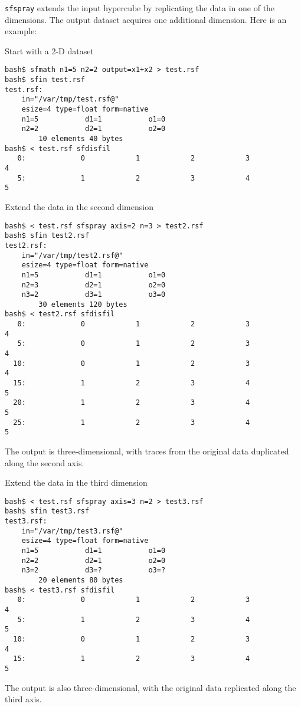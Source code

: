 \noindent\doublebox{\parbox{\textwidth}{
    
  }}

\texttt{sfspray} extends the input hypercube by replicating the data
in one of the dimensions. The output dataset acquires one additional
dimension. Here is an example:

Start with a 2-D dataset
\begin{verbatim}
bash$ sfmath n1=5 n2=2 output=x1+x2 > test.rsf
bash$ sfin test.rsf
test.rsf:
    in="/var/tmp/test.rsf@"
    esize=4 type=float form=native 
    n1=5           d1=1           o1=0          
    n2=2           d2=1           o2=0          
        10 elements 40 bytes
bash$ < test.rsf sfdisfil
   0:             0            1            2            3            4
   5:             1            2            3            4            5
\end{verbatim}

Extend the data in the second dimension
\begin{verbatim}
bash$ < test.rsf sfspray axis=2 n=3 > test2.rsf
bash$ sfin test2.rsf
test2.rsf:
    in="/var/tmp/test2.rsf@"
    esize=4 type=float form=native 
    n1=5           d1=1           o1=0          
    n2=3           d2=1           o2=0          
    n3=2           d3=1           o3=0          
        30 elements 120 bytes
bash$ < test2.rsf sfdisfil
   0:             0            1            2            3            4
   5:             0            1            2            3            4
  10:             0            1            2            3            4
  15:             1            2            3            4            5
  20:             1            2            3            4            5
  25:             1            2            3            4            5
\end{verbatim}
The output is three-dimensional, with traces from the original
data duplicated along the second axis.

Extend the data in the third dimension
\begin{verbatim}
bash$ < test.rsf sfspray axis=3 n=2 > test3.rsf
bash$ sfin test3.rsf
test3.rsf:
    in="/var/tmp/test3.rsf@"
    esize=4 type=float form=native 
    n1=5           d1=1           o1=0          
    n2=2           d2=1           o2=0          
    n3=2           d3=?           o3=?          
        20 elements 80 bytes
bash$ < test3.rsf sfdisfil
   0:             0            1            2            3            4
   5:             1            2            3            4            5
  10:             0            1            2            3            4
  15:             1            2            3            4            5
\end{verbatim}
The output is also three-dimensional, with the original data replicated
along the third axis.

